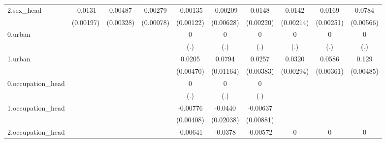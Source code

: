 \begin{table}[htbp]
\begin{tabular}{l*{9}{c}}
2.sex\_head  &     -0.0131\sym{***}&     0.00487         &     0.00279\sym{***}&    -0.00135         &    -0.00209         &      0.0148\sym{***}&      0.0142\sym{***}&      0.0169\sym{***}&      0.0784\sym{***}\\
            &   (0.00197)         &   (0.00328)         &   (0.00078)         &   (0.00122)         &   (0.00628)         &   (0.00220)         &   (0.00214)         &   (0.00251)         &   (0.00566)         \\
0.urban     &                     &                     &                     &           0         &           0         &           0         &           0         &           0         &           0         \\
            &                     &                     &                     &         (.)         &         (.)         &         (.)         &         (.)         &         (.)         &         (.)         \\
1.urban     &                     &                     &                     &      0.0205\sym{***}&      0.0794\sym{***}&      0.0257\sym{***}&      0.0320\sym{***}&      0.0586\sym{***}&       0.129\sym{***}\\
            &                     &                     &                     &   (0.00470)         &   (0.01164)         &   (0.00383)         &   (0.00294)         &   (0.00361)         &   (0.00485)         \\
0.occupation\_head&                     &                     &                     &           0         &           0         &           0         &                     &                     &                     \\
            &                     &                     &                     &         (.)         &         (.)         &         (.)         &                     &                     &                     \\
1.occupation\_head&                     &                     &                     &    -0.00776\sym{*}  &     -0.0440\sym{**} &    -0.00637         &                     &                     &                     \\
            &                     &                     &                     &   (0.00408)         &   (0.02038)         &   (0.00881)         &                     &                     &                     \\
2.occupation\_head&                     &                     &                     &    -0.00641\sym{***}&     -0.0378\sym{***}&    -0.00572\sym{*}  &           0         &           0         &           0         \\

\end{tabular}
\end{table}
